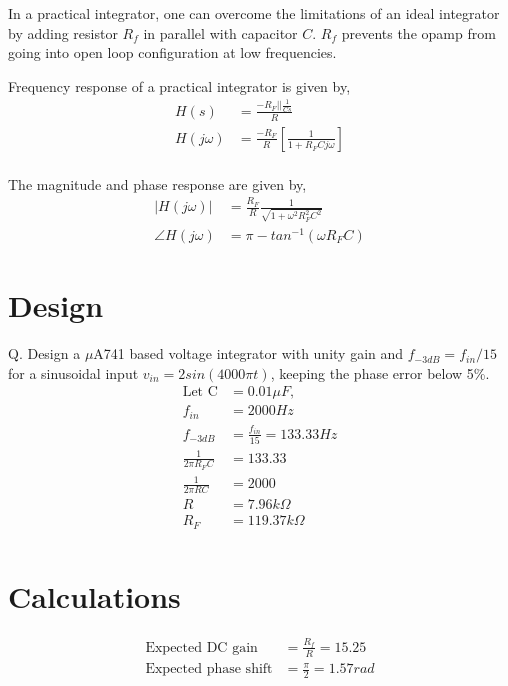 \documentclass[12pt, titlepage]{article}
\theoremstyle{definition}
\begin{document}
    In a practical integrator, one can overcome the limitations of an ideal integrator by adding resistor $R_{f}$ in parallel with capacitor $C$.
    $R_{f}$ prevents the opamp from going into open loop configuration at low frequencies.

    Frequency response of a practical integrator is given by,
    \begin{align*}
      H(s) &= \frac{-R_{F} || \frac{1}{Cs}}{R} \\
      H(j\omega) &= \frac{-R_{F}}{R} \left[ \frac{1}{1+R_{F}Cj\omega} \right] \\
    \end{align*}

    The magnitude and phase response are given by,
    \begin{align*}
    |H(j\omega)| &= \frac{R_{F}}{R}\frac{1}{\sqrt{1+\omega^{2}R_{F}^{2}C^{2}}} \\
    \angle H(j\omega) &= \pi - tan^{-1}(\omega R_{F}C)
    \end{align*}


  \newpage
  \section{Design}
    Q. Design a $\mu$A741 based voltage integrator with unity gain and
    $f_{-3dB} = f_{in}/15$ for a sinusoidal input
    $v_{in} = 2 sin(4000\pi t)$, keeping the phase error below 5\%.
    \begin{align*}
        \text{Let C} \! &=0.01\mu F , \\
        f_{in} &=2000 Hz\\
        f_{-3dB} &=\frac{f_{in}}{15} = 133.33 Hz \\
        \frac{1}{2\pi R_{F}C} &= 133.33\\
        \frac{1}{2\pi RC} &= 2000\\
        R &=7.96k\Omega\\
        R_{F} &=119.37k\Omega\\
    \end{align*}


  \section{Calculations}
  \begin{align*}
  \text{Expected DC gain} &= \frac{R_{f}}{R}=15.25\\
  \text{Expected phase shift} &= \frac{\pi}{2}=1.57 rad
  \end{align*}
\end{document}
